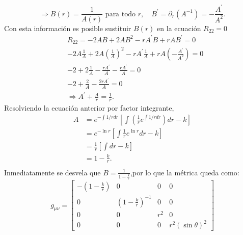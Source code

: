 \begin{equation}
    \Rightarrow B(r)=\frac{1}{A(r)} \text { para todo } r, \quad  B^{\prime}=\partial_r\left(A^{-1}\right)=-\frac{A^{\prime}}{A^2}.
\end{equation}
Con esta información es posible sustituir \( B(r) \) en la ecuación \( R_{22} = 0 \)
\begin{equation}
    \begin{aligned}
         & R_{22}=-2 A B+2 A B^2-r A^{\prime} B+r A B^{\prime}   = 0                                                         \\
         & -2 A \frac{1}{A}+2 A\left(\frac{1}{A}\right)^2-r A^{\prime} \frac{1}{A}+r A\left(-\frac{A^{\prime}}{A^2}\right)=0 \\
         & -2 + 2 \frac{1}{A}-\frac{r A^{\prime}}{A}- \frac{r A^{\prime}}{A}=0                                               \\
         & -2 + \frac{2}{A} - \frac{2r A^{\prime}}{A}=0                                                                      \\
         & \Rightarrow  A^{\prime} + \frac{A}{r}=\frac{1}{r}.
    \end{aligned}
    \label{eq:ricci22}
\end{equation}
Resolviendo la ecuación anterior por factor integrante,
\begin{equation}
    \begin{aligned}
        A & = e^{- \int 1/r d r} \left[\int \left(\frac{1}{r}e^{\int 1/r dr } \right)dr - k\right] \\
          & = e^{- \ln r} \left[\int \frac{1}{r} e^{\ln r} dr   - k\right]                         \\
          & =\frac{1}{r}\left[\int dr - k\right]                                                   \\
          & = 1 - \frac{k}{r}.                                                                     \\
    \end{aligned}
\end{equation}
Inmediatamente se desvela que $B=\frac{1}{1 - \frac{k}{r}}  $,por lo que la métrica queda como:
\begin{equation}
    g_{\mu \nu} =\left[\begin{array}{cccc}
            -\left(1-\frac{k}{r}\right) & 0                               & 0   & 0                  \\
            0                           & \left(1-\frac{k}{r}\right)^{-1} & 0   & 0                  \\
            0                           & 0                               & r^2 & 0                  \\
            0                           & 0                               & 0   & r^2(\sin \theta)^2
        \end{array}\right]
\end{equation}
